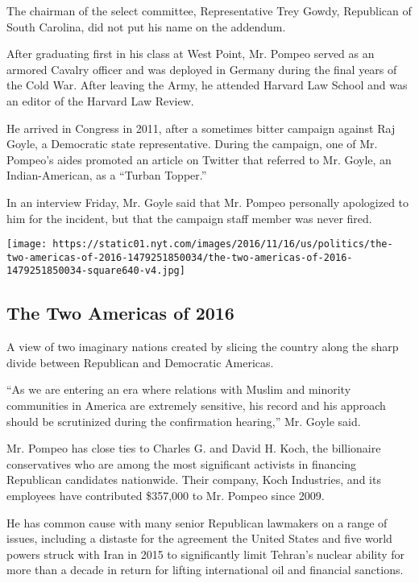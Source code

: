 The chairman of the select committee, Representative Trey Gowdy,
Republican of South Carolina, did not put his name on the addendum.

After graduating first in his class at West Point, Mr. Pompeo served as
an armored Cavalry officer and was deployed in Germany during the final
years of the Cold War. After leaving the Army, he attended Harvard Law
School and was an editor of the Harvard Law Review.

He arrived in Congress in 2011, after a sometimes bitter campaign
against Raj Goyle, a Democratic state representative. During the
campaign, one of Mr. Pompeo's aides promoted an article on Twitter that
referred to Mr. Goyle, an Indian-American, as a ``Turban Topper.''

In an interview Friday, Mr. Goyle said that Mr. Pompeo personally
apologized to him for the incident, but that the campaign staff member
was never fired.

\href{https://www.nytimes.com/interactive/2016/11/16/us/politics/the-two-americas-of-2016.html}{}

\texttt{[image: https://static01.nyt.com/images/2016/11/16/us/politics/the-two-americas-of-2016-1479251850034/the-two-americas-of-2016-1479251850034-square640-v4.jpg]}

\hypertarget{the-two-americas-of-2016}{%
\subsection{The Two Americas of 2016}\label{the-two-americas-of-2016}}

A view of two imaginary nations created by slicing the country along the
sharp divide between Republican and Democratic Americas.

``As we are entering an era where relations with Muslim and minority
communities in America are extremely sensitive, his record and his
approach should be scrutinized during the confirmation hearing,'' Mr.
Goyle said.

Mr. Pompeo has close ties to Charles G. and David H. Koch, the
billionaire conservatives who are among the most significant activists
in financing Republican candidates nationwide. Their company, Koch
Industries, and its employees have contributed \$357,000 to Mr. Pompeo
since 2009.

He has common cause with many senior Republican lawmakers on a range of
issues, including a distaste for the agreement the United States and
five world powers struck with Iran in 2015 to significantly limit
Tehran's nuclear ability for more than a decade in return for lifting
international oil and financial sanctions.

